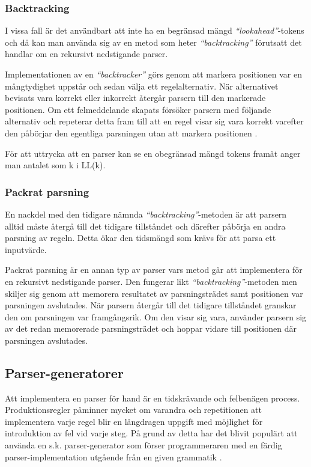 \subsubsection{Backtracking}

I vissa fall är det användbart att inte ha en begränsad mängd
\textit{``lookahead''}-tokens och då kan man använda sig av en metod som heter
\textit{``backtracking''} förutsatt det handlar om en rekursivt nedstigande
parser.

Implementationen av en \textit{``backtracker''} görs genom att markera
positionen var en mångtydighet uppstår och sedan välja ett regelalternativ.
När alternativet bevisats vara korrekt eller inkorrekt återgår parsern till
den markerade positionen. Om ett felmeddelande skapats försöker parsern med
följande alternativ och repeterar detta fram till att en regel visar sig vara
korrekt varefter den påbörjar den egentliga parsningen utan att markera
positionen \citep[s. 57]{pt10}.

För att uttrycka att en parser kan se en obegränsad mängd tokens framåt anger
man antalet som k i LL(k).

\subsubsection{Packrat parsning}

En nackdel med den tidigare nämnda \textit{``backtracking''}-metoden är att
parsern alltid måste återgå till det tidigare tillståndet och därefter påbörja
en andra parsning av regeln. Detta ökar den tidsmängd som krävs för att parsa
ett inputvärde.

Packrat parsning är en annan typ av parser vars metod går att implementera för
en rekursivt nedstigande parser. Den fungerar likt
\textit{``backtracking''}-metoden men skiljer sig genom att memorera
resultatet av parsningsträdet samt positionen var parsningen avslutades. När
parsern återgår till det tidigare tillståndet granskar den om parsningen var
framgångsrik. Om den visar sig vara, använder parsern sig av det redan
memorerade parsningsträdet och hoppar vidare till positionen där parsningen
avslutades.

\subsection{Parser-generatorer}

Att implementera en parser för hand är en tidskrävande och felbenägen process.
Produktionsregler påminner mycket om varandra och repetitionen att
implementera varje regel blir en långdragen uppgift med möjlighet för
introduktion av fel vid varje steg. På grund av detta har det blivit populärt
att använda en s.k. parser-generator som förser programmeraren med en färdig
parser-implementation utgående från en given grammatik \citep[s. 26]{pt10}.

